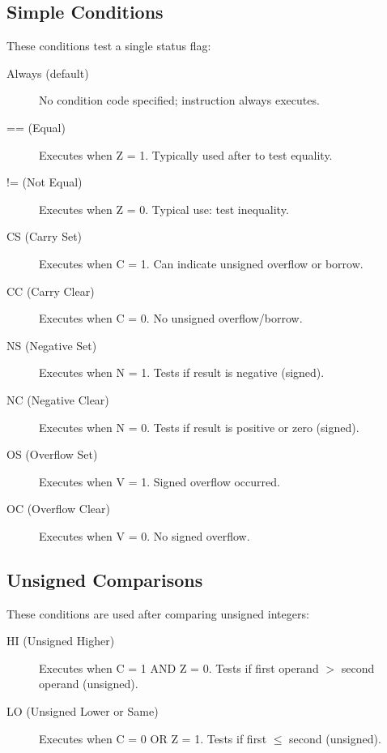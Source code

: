 \subsection{Simple Conditions}

These conditions test a single status flag:

\begin{description}
	\item[Always (default)] No condition code specified; instruction always executes.

	\item[== (Equal)] Executes when Z = 1. Typically used after  to test equality.

	\item[!= (Not Equal)] Executes when Z = 0. Typical use: test inequality.

	\item[CS (Carry Set)] Executes when C = 1. Can indicate unsigned overflow or borrow.

	\item[CC (Carry Clear)] Executes when C = 0. No unsigned overflow/borrow.

	\item[NS (Negative Set)] Executes when N = 1. Tests if result is negative (signed).

	\item[NC (Negative Clear)] Executes when N = 0. Tests if result is positive or zero (signed).

	\item[OS (Overflow Set)] Executes when V = 1. Signed overflow occurred.

	\item[OC (Overflow Clear)] Executes when V = 0. No signed overflow.
\end{description}

\subsection{Unsigned Comparisons}

These conditions are used after comparing unsigned integers:

\begin{description}
	\item[HI (Unsigned Higher)] Executes when C = 1 AND Z = 0. Tests if first operand $>$ second operand (unsigned).

	\item[LO (Unsigned Lower or Same)] Executes when C = 0 OR Z = 1. Tests if first $\leq$ second (unsigned).
\end{description}

